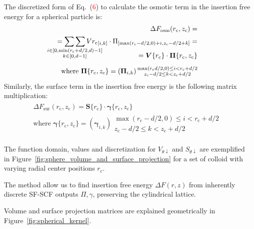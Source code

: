 \documentclass[10pt, a4paper]{article}
\newcommand\todo[1]{\textcolor{red}{#1}}
\begin{document}
\begin{multicols}{2}
The discretized form of Eq.~(\todo{6}) to calculate the osmotic term in the insertion free energy for a spherical particle is:
\begin{eqnarray}
    \begin{aligned}
        \Delta F_{\text{osm}}(r_{\text{c}}, z_{\text{c}}) =\\
        = \mathop{\sum\sum}_{\mathclap{\substack{i \in [0, \min(r_{\text{c}}+d/2,d)-1] \\ k \in [0, d-1]}}} V{r_{\text{c}}}_{[i, k]} \cdot \Pi_{[\max(r_{\text{c}}-d/2,0)+i, z_{\text{c}}-d/2+k]} =\\[-15pt]
        = \bm{V}\{r_{\text{c}}\} \cdot \bm{\Pi}\{r_{\text{c}}, z_{\text{c}}\} \\[5pt]
        \text{where } \bm{\Pi}\{r_{\text{c}},z_{\text{c}}\} =\left(\bm{\Pi}_{i,k}\right) {\substack{\max(r_{\text{c}}d/2,0) \le i < r_{\text{c}}+d/2 \\ z_{\text{c}}-d/2 \le k < z_{\text{c}}+d/2}}
    \end{aligned}
\end{eqnarray}
Similarly, the surface term in the insertion free energy is the following matrix multiplication:
\begin{eqnarray}
    \begin{aligned}
        \Delta F_{\text{sur}}(r_{\text{c}}, z_{\text{c}}) = \bm{S}\{r_{\text{c}}\} \cdot \bm{\gamma}\{r_{\text{c}}, z_{\text{c}}\} \\[5pt]
        \text{where } \bm{\gamma}\{r_{\text{c}},z_{\text{c}}\} =\left(\bm{\gamma}_{i,k}\right) {\substack{\max(r_{\text{c}}-d/2,0) \le i < r_{\text{c}}+d/2 \\ z_{\text{c}}-d/2 \le k < z_{\text{c}}+d/2}}
    \end{aligned}
\end{eqnarray}

The function domain, values and discretization for $V_{\theta \downarrow}$ and $S_{\theta \downarrow}$ are exemplified in Figure~\ref{fig:sphere_volume_and_surface_projection} for a set of colloid with varying radial center positions $r_{\text{c}}$.

The method allow us to find insertion free energy $\Delta F(r,z)$ from inherently discrete SF-SCF outputs $\Pi, \gamma$, preserving the cylindrical lattice.

Volume and surface projection matrices are explained geometrically in Figure~\ref{fig:spherical_kernel}.



\end{multicols}
\end{document}
